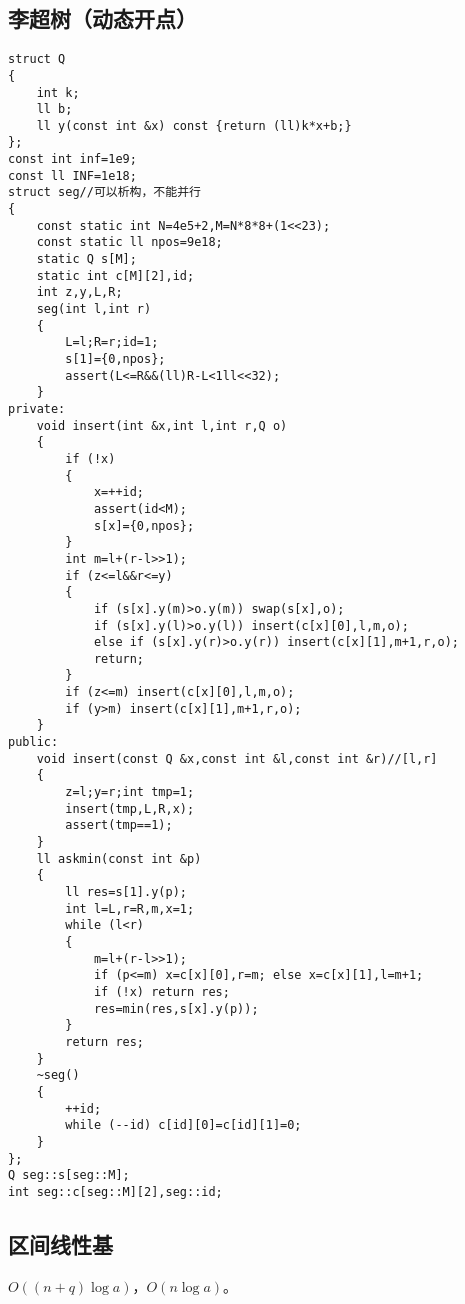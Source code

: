 \documentclass[12pt]{ctexart}
\begin{document}
\subsection{李超树（动态开点）}
\begin{lstlisting}
struct Q
{
	int k;
	ll b;
	ll y(const int &x) const {return (ll)k*x+b;}
};
const int inf=1e9;
const ll INF=1e18;
struct seg//可以析构，不能并行
{
	const static int N=4e5+2,M=N*8*8+(1<<23);
	const static ll npos=9e18;
	static Q s[M];
	static int c[M][2],id;
	int z,y,L,R;
	seg(int l,int r)
	{
		L=l;R=r;id=1;
		s[1]={0,npos};
		assert(L<=R&&(ll)R-L<1ll<<32);
	}
private:
	void insert(int &x,int l,int r,Q o)
	{
		if (!x)
		{
			x=++id;
			assert(id<M);
			s[x]={0,npos};
		}
		int m=l+(r-l>>1);
		if (z<=l&&r<=y)
		{
			if (s[x].y(m)>o.y(m)) swap(s[x],o);
			if (s[x].y(l)>o.y(l)) insert(c[x][0],l,m,o);
			else if (s[x].y(r)>o.y(r)) insert(c[x][1],m+1,r,o);
			return;
		}
		if (z<=m) insert(c[x][0],l,m,o);
		if (y>m) insert(c[x][1],m+1,r,o);
	}
public:
	void insert(const Q &x,const int &l,const int &r)//[l,r]
	{
		z=l;y=r;int tmp=1;
		insert(tmp,L,R,x);
		assert(tmp==1);
	}
	ll askmin(const int &p)
	{
		ll res=s[1].y(p);
		int l=L,r=R,m,x=1;
		while (l<r)
		{
			m=l+(r-l>>1);
			if (p<=m) x=c[x][0],r=m; else x=c[x][1],l=m+1;
			if (!x) return res;
			res=min(res,s[x].y(p));
		}
		return res;
	}
	~seg()
	{
		++id;
		while (--id) c[id][0]=c[id][1]=0;
	}
};
Q seg::s[seg::M];
int seg::c[seg::M][2],seg::id;
\end{lstlisting}


\subsection{区间线性基}

$O((n+q)\log a)$，$O(n\log a)$。
\end{document}
